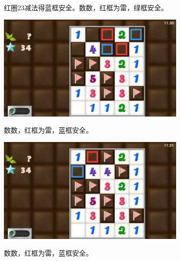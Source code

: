 红圈23减法得蓝框安全。数数，红框为雷，绿框安全。
\begin{center}
    \includegraphics[width=0.7\textwidth]{puzzlelow/216-8.jpg}
\end{center}
数数，红框为雷，蓝框安全。
\begin{center}
    \includegraphics[width=0.7\textwidth]{puzzlelow/216-9.jpg}
\end{center}
数数，红框为雷，蓝框安全。


